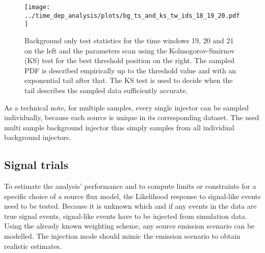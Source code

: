 \begin{figure}[htbp]
  \centering
  \texttt{[image: ../time\_dep\_analysis/plots/bg\_ts\_and\_ks\_tw\_ids\_18\_19\_20.pdf]}
  \caption[Background test statistics for the time windows 19, 20 and 21]{
    Background only test statistics for the time windows 19, 20 and 21 on the left and the parameters scan using the Kolmogorov-Smirnov (KS) test for the best threshold position on the right.
    The sampled PDF is described empirically up to the threshold value and with an exponential tail after that.
    The KS test is used to decide when the tail describes the sampled data sufficiently accurate.
  }
  \label{fig:bg_ts_and_ks_tw_ids_18_19_20}
\end{figure}


As a technical note, for multiple samples, every single injector can be sampled individually, because each source is unique in its corresponding dataset.
The used multi sample background injector thus simply samples from all individual background injectors.

\subsection*{Signal trials}
To estimate the analysis' performance and to compute limits or constraints for a specific choice of a source flux model, the Likelihood response to signal-like events need to be tested.
Because it is unknown which and if any events in the data are true signal events, signal-like events have to be injected from simulation data.
Using the already known weighting scheme, any source emission scenario can be modelled.
The injection mode should mimic the emission scenario to obtain realistic estimates.

